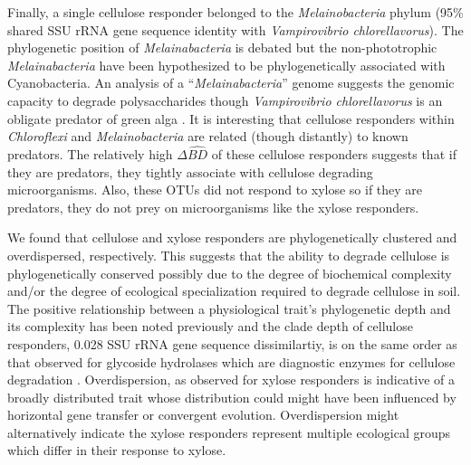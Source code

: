 Finally, a single cellulose responder belonged to the \textit{Melainobacteria}
phylum (95\% shared SSU rRNA gene sequence identity with \textit{Vampirovibrio
chlorellavorus}). The phylogenetic position of \textit{Melainabacteria} is
debated but the non-phototrophic \textit{Melainabacteria} have been
hypothesized to be phylogenetically associated with Cyanobacteria. An analysis
of a ``\textit{Melainabacteria}'' genome \citep{Di_Rienzi_2013} suggests the
genomic capacity to degrade polysaccharides though \textit{Vampirovibrio
chlorellavorus} is an obligate predator of green alga \citep{gromov_1972}. It
is interesting that cellulose responders within \textit{Chloroflexi} and
\textit{Melainobacteria} are related (though distantly) to known predators. The
relatively high $\Delta\hat{BD}$ of these cellulose responders suggests that if
they are predators, they tightly associate with cellulose degrading
microorganisms. Also, these OTUs did not respond to xylose so if they are
predators, they do not prey on microorganisms like the xylose responders.

We found that cellulose and xylose responders are phylogenetically clustered
and overdispersed, respectively. This suggests that the ability to degrade
cellulose is phylogenetically conserved possibly due to the degree of
biochemical complexity and/or the degree of ecological specialization required
to degrade cellulose in soil. The positive relationship between a physiological
trait’s phylogenetic depth and its complexity has been noted previously
\citep{Martiny2013} and the clade depth of cellulose responders, 0.028 SSU
rRNA gene sequence dissimilartiy, is on the same order as that observed
for glycoside hydrolases which are diagnostic enzymes for cellulose
degradation \citep{Berlemont2013}. Overdispersion, as observed for xylose
responders is indicative of a broadly distributed trait whose distribution
could might have been influenced by horizontal gene transfer or convergent
evolution. Overdispersion might alternatively indicate the xylose responders
represent multiple ecological groups which differ in their response to xylose. 

